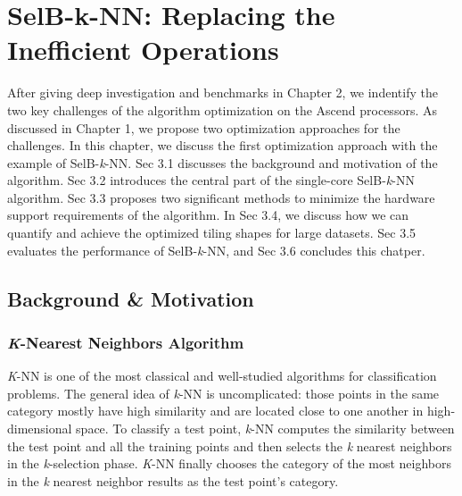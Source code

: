 \chapter{SelB-k-NN: Replacing the Inefficient Operations}
\label{sec_3}

After giving deep investigation and benchmarks in Chapter 2, we indentify the two key challenges of the algorithm optimization on the Ascend processors. As discussed in Chapter 1, we propose two optimization approaches for the challenges. In this chapter, we discuss the first optimization approach with the example of SelB-\textit{k}-NN. Sec 3.1 discusses the background and motivation of the algorithm. Sec 3.2 introduces the central part of the single-core SelB-\textit{k}-NN algorithm. Sec 3.3 proposes two significant methods to minimize the hardware support requirements of the algorithm. In Sec 3.4, we discuss how we can quantify and achieve the optimized tiling shapes for large datasets. Sec 3.5 evaluates the performance of SelB-\textit{k}-NN, and Sec 3.6 concludes this chatper.

\section{Background \& Motivation}

\subsection{\textit{K}-Nearest Neighbors Algorithm}

\textit{K}-NN is one of the most classical and well-studied algorithms for classification problems. The general idea of \textit{k}-NN is uncomplicated: those points in the same category mostly have high similarity and are located close to one another in high-dimensional space. To classify a test point, \textit{k}-NN computes the similarity between the test point and all the training points and then selects the \textit{k} nearest neighbors in the \textit{k}-selection phase. \textit{K}-NN finally chooses the category of the most neighbors in the \textit{k} nearest neighbor results as the test point's category.

